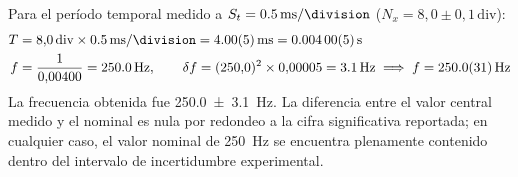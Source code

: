 Para el período temporal medido a $S_t = \qty{0,5}{\milli\second\per\division}$ ($N_x = 8{,}0 \pm 0{,}1\,\text{div}$):
\begin{align}
    T &= 8{,}0\,\text{div} \times \qty{0,5}{\milli\second\per\division} = \qty{4,00 \pm 0,05}{\milli\second} = \qty{0,00400 \pm 0,00005}{\second} \\
    f &= \frac{1}{0{,}00400} = \qty{250,0}{\hertz}, \qquad \delta f = (250{,}0)^2 \times 0{,}00005 = \qty{3,1}{\hertz} \implies f = \qty{250,0 \pm 3,1}{\hertz}
\end{align}
La frecuencia obtenida fue \qty{250,0 \pm 3,1}{\hertz}. La diferencia entre el valor central medido y el nominal es nula por redondeo a la cifra significativa reportada; en cualquier caso, el valor nominal de \qty{250}{\hertz} se encuentra plenamente contenido dentro del intervalo de incertidumbre experimental.

